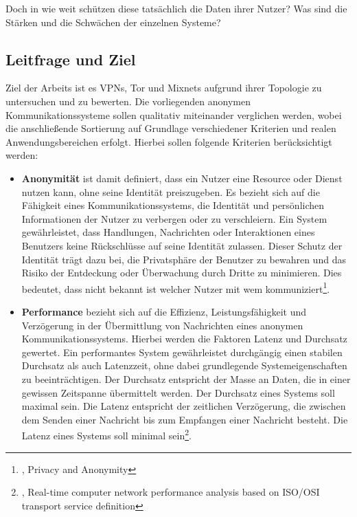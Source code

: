 Doch in wie weit schützen diese tatsächlich die Daten ihrer Nutzer? Was sind die Stärken und die Schwächen der einzelnen Systeme? 

\subsection{Leitfrage und Ziel}

Ziel der Arbeits ist es VPNs, Tor und Mixnets aufgrund ihrer Topologie zu untersuchen und zu bewerten. Die vorliegenden anonymen Kommunikationssysteme sollen qualitativ miteinander verglichen werden, wobei die anschließende Sortierung auf Grundlage verschiedener Kriterien und realen Anwendungsbereichen erfolgt. Hierbei sollen folgende Kriterien berücksichtigt werden:

\begin{itemize}
    \item \textbf{Anonymität} ist damit definiert, dass ein Nutzer eine Resource oder Dienst nutzen kann, ohne seine Identität preiszugeben. Es bezieht sich auf die Fähigkeit eines Kommunikationssystems, die Identität und persönlichen Informationen der Nutzer zu verbergen oder zu verschleiern. Ein System gewährleistet, dass Handlungen, Nachrichten oder Interaktionen eines Benutzers keine Rückschlüsse auf seine Identität zulassen. Dieser Schutz der Identität trägt dazu bei, die Privatsphäre der Benutzer zu bewahren und das Risiko der Entdeckung oder Überwachung durch Dritte zu minimieren. Dies bedeutet, dass nicht bekannt ist welcher Nutzer mit wem kommuniziert\footnote{\cite{DefinitionOfAnonymity}, Privacy and Anonymity}.

    \item \textbf{Performance} bezieht sich auf die Effizienz, Leistungsfähigkeit und Verzögerung in der Übermittlung von Nachrichten eines anonymen Kommunikationssystems. Hierbei werden die Faktoren Latenz und Durchsatz gewertet. Ein performantes System gewährleistet durchgängig einen stabilen Durchsatz als auch Latenzzeit, ohne dabei grundlegende Systemeigenschaften zu beeinträchtigen. Der Durchsatz entspricht der Masse an Daten, die in einer gewissen Zeitspanne übermittelt werden. Der Durchsatz eines Systems soll maximal sein. Die Latenz entspricht der zeitlichen Verzögerung, die zwischen dem Senden einer Nachricht bis zum Empfangen einer Nachricht besteht. Die Latenz eines Systems soll minimal sein\footnote{\cite{ComputerNetworkPerformanceAnalysis}, Real-time computer network performance analysis based on ISO/OSI transport service definition}.
\end{itemize}
